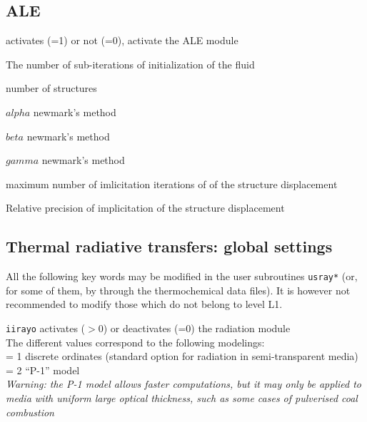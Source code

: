\subsection{ALE}
{activates (=1) or not (=0), activate the ALE module}

{The number of sub-iterations of initialization of the fluid}

{number of structures}

{$alpha$ newmark's method}

{$beta$ newmark's method}

{$gamma$ newmark's method}

{maximum number of imlicitation iterations of of the structure displacement}

{Relative precision of implicitation of the structure displacement }


\subsection{Thermal radiative transfers: global settings}

All the following key words may be modified in the user subroutines
\texttt{usray*} (or, for some of them, by through the thermochemical data files).
It is however not recommended to modify those which do not belong to
level L1.

{{\tt iirayo} activates ($>0$) or deactivates
(=0) the radiation module\\
The different values correspond to the following modelings:\\
\hspace*{1.3cm} = 1 discrete ordinates
(standard option for radiation in semi-transparent media)\\
\hspace*{1.3cm} = 2  ``P-1'' model\\
{\em Warning: the P-1 model allows faster computations, but it
may only be applied to media with uniform large optical thickness, such as
some cases of pulverised coal combustion}}

